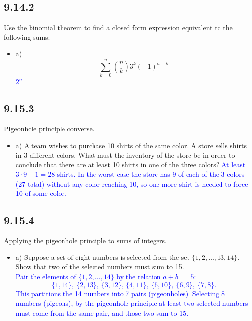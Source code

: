 \documentclass{article}
\begin{document}
\subsection*{9.14.2} Use the binomial theorem to find a closed form expression equivalent to the following sums:
\begin{itemize}
    \item a) \[\sum_{k=0}^{n} \binom{n}{k} 3^k(-1)^{n-k}\]
    \textcolor{blue}{$2^n$}
\end{itemize}

\subsection*{9.15.3} Pigeonhole principle converse.
\begin{itemize}
    \item a) A team wishes to purchase 10 shirts of the same color. A store sells shirts in 3 different colors. What must the inventory of the store be in order to conclude that there are at least 10 shirts in one of the three colors?
    \textcolor{blue}{At least $3 \cdot 9 + 1 = 28$ shirts. In the worst case the store has 9 of each of the 3 colors (27 total) without any color reaching 10, so one more shirt is needed to force 10 of some color.}
\end{itemize}

\subsection*{9.15.4} Applying the pigeonhole principle to sums of integers.
\begin{itemize}
    \item a) Suppose a set of eight numbers is selected from the set $\{1,2,\ldots,13,14\}$. Show that two of the selected numbers must sum to 15. \\
    \textcolor{blue}{Pair the elements of $\{1, 2, \ldots, 14\}$ by the relation $a + b = 15$:
    \[ \{1,14\},\ \{2,13\},\ \{3,12\},\ \{4,11\},\ \{5,10\},\ \{6,9\},\ \{7,8\}. \]
    This partitions the 14 numbers into 7 pairs (pigeonholes). Selecting 8 numbers (pigeons), by the pigeonhole principle at least two selected numbers must come from the same pair, and those two sum to 15.}
\end{itemize}
\end{document}
